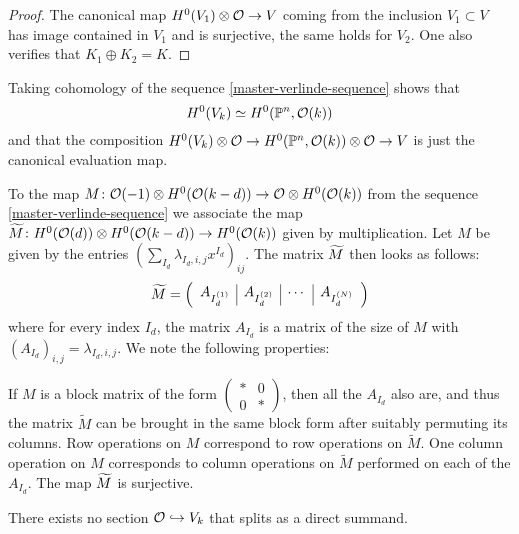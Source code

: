 \begin{proof}
	The canonical map $H^0(V_1)\otimes \mathcal{O} \to V$ coming from the inclusion $V_1\subset V$ has image contained in $V_1$ and is surjective, the same holds for $V_2$. One also verifies that $K_1\oplus K_2 = K$.
\end{proof}

\begin{remark}
	Taking cohomology of the sequence
	\cref{master-verlinde-sequence} shows that \[H^0(V_k)\simeq H^0(\mathbb{P}^n, \mathcal{O}(k))\] and that the composition $H^0(V_k)\otimes \mathcal{O}\to H^0(\mathbb{P}^n, \mathcal{O}(k))\otimes \mathcal{O}\to V$ is just the canonical evaluation map. 
\end{remark}

\begin{construction} \label{matrix-tilde}
	To the map $M\colon \mathcal{O}(-1)\otimes H^0(\mathcal{O}(k-d)) \to \mathcal{O}\otimes H^0(\mathcal{O}(k))$ from the sequence
	\cref{master-verlinde-sequence}
	we associate the map $\widetilde M\colon H^0(\mathcal{O}(d))\otimes H^0(\mathcal{O}(k-d))\to H^0(\mathcal{O}(k))$ given by multiplication. Let $M$ be given by the entries $(\sum_{I_d} \lambda_{I_d,i,j} x^{I_d})_{ij}$. The matrix
	$\widetilde M$ then looks as follows:
	\[
		\widetilde M = \left(
  		\begin{array}{c|c|c|c}
  			A_{I_d^{(1)}} & A_{I_d^{(2)}} & \cdots & A_{I_d^{(N)}} \\
  		\end{array}
  	\right)
	\]
	where for every index $I_d$, the matrix $A_{I_d}$ is a matrix of the size of $M$ with $(A_{I_d})_{i,j} = \lambda_{I_d,i,j}$. We note the following properties:
	\begin{enumerate}
		\huyitem If $M$ is a block matrix of the form
		$\left( \begin{smallmatrix}* & 0 \\ 0 & *\end{smallmatrix} \right)$, then all the $A_{I_d}$ also are, and thus the matrix $\widetilde M$ can be brought in the same block form after suitably permuting its columns. 
		\huyitem Row operations on $M$ correspond to row operations on $\widetilde M$. One column operation on $M$ corresponds to column operations on $\widetilde M$ performed on each of the $A_{I_d}$.
		\huyitem The map $\widetilde M$ is surjective.
	\end{enumerate}
\end{construction}

\begin{proposition} \label{no-splitting-sections}
	There exists no section $\mathcal{O}\hookrightarrow V_k$ that splits as a direct summand.
\end{proposition}

